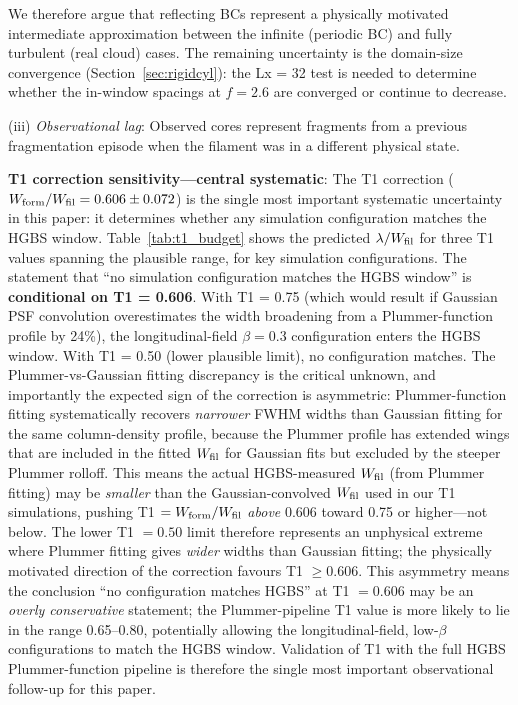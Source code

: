 \documentclass[twoside,twocolumn]{mnras}
\begin{document}
We therefore argue that reflecting BCs represent a physically motivated intermediate
approximation between the infinite (periodic BC) and fully turbulent (real cloud) cases.
The remaining uncertainty is the domain-size convergence (Section~\ref{sec:rigidcyl}):
the Lx = 32 test is needed to determine whether the in-window spacings at $f = 2.6$
are converged or continue to decrease.

(iii) \textit{Observational lag}: Observed cores represent fragments from a previous
fragmentation episode when the filament was in a different physical state.

\textbf{T1 correction sensitivity---central systematic}: The T1 correction
($W_{\rm form}/W_{\rm fil} = 0.606 \pm 0.072$) is the single most important systematic
uncertainty in this paper: it determines whether any simulation configuration matches
the HGBS window. Table~\ref{tab:t1_budget} shows the predicted $\lambda/W_{\rm fil}$
for three T1 values spanning the plausible range, for key simulation configurations.
The statement that ``no simulation configuration matches the HGBS window'' is
\textbf{conditional on T1 = 0.606}. With T1 = 0.75 (which would result if Gaussian
PSF convolution overestimates the width broadening from a Plummer-function profile by
24\%), the longitudinal-field $\beta = 0.3$ configuration enters the HGBS window.
With T1 = 0.50 (lower plausible limit), no configuration matches. The Plummer-vs-Gaussian fitting discrepancy is the critical unknown, and importantly the expected sign of the correction is asymmetric: Plummer-function fitting systematically recovers \textit{narrower} FWHM widths than Gaussian fitting for the same column-density profile, because the Plummer profile has extended wings that are included in the fitted $W_{\rm fil}$ for Gaussian fits but excluded by the steeper Plummer rolloff. This means the actual HGBS-measured $W_{\rm fil}$ (from Plummer fitting) may be \textit{smaller} than the Gaussian-convolved $W_{\rm fil}$ used in our T1 simulations, pushing T1 $= W_{\rm form}/W_{\rm fil}$ \textit{above} 0.606 toward 0.75 or higher---not below. The lower T1 $= 0.50$ limit therefore represents an unphysical extreme where Plummer fitting gives \textit{wider} widths than Gaussian fitting; the physically motivated direction of the correction favours T1 $\geq 0.606$. This asymmetry means the conclusion ``no configuration matches HGBS'' at T1 $= 0.606$ may be an \textit{overly conservative} statement; the Plummer-pipeline T1 value is more likely to lie in the range 0.65--0.80, potentially allowing the longitudinal-field, low-$\beta$ configurations to match the HGBS window. Validation of T1 with the full HGBS Plummer-function pipeline is therefore the single most important observational follow-up for this paper.
\end{document}
